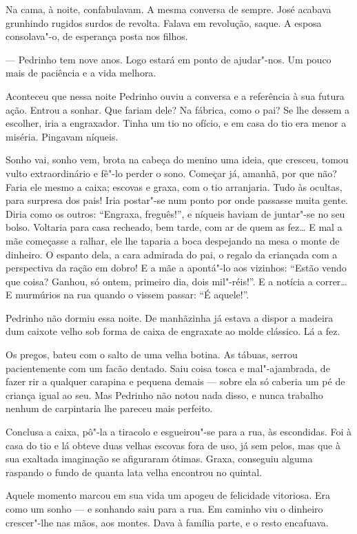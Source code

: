 Na cama, à noite, confabulavam. A mesma conversa de sempre. José acabava
grunhindo rugidos surdos de revolta. Falava em revolução, saque. A
esposa consolava"-o, de esperança posta nos filhos.

--- Pedrinho tem nove anos. Logo estará em ponto de ajudar"-nos. Um pouco
mais de paciência e a vida melhora.

Aconteceu que nessa noite Pedrinho ouviu a conversa e a referência à sua
futura ação. Entrou a sonhar. Que fariam dele? Na fábrica, como o pai?
Se lhe dessem a escolher, iria a engraxador. Tinha um tio no ofício, e
em casa do tio era menor a miséria. Pingavam níqueis.

Sonho vai, sonho vem, brota na cabeça do menino uma ideia, que cresceu,
tomou vulto extraordinário e fê"-lo perder o sono. Começar já, amanhã,
por que não? Faria ele mesmo a caixa; escovas e graxa, com o tio
arranjaria. Tudo às ocultas, para surpresa dos pais! Iria postar"-se num
ponto por onde passasse muita gente. Diria como os outros: ``Engraxa,
freguês!'', e níqueis haviam de juntar"-se no seu bolso. Voltaria para
casa recheado, bem tarde, com ar de quem as fez\ldots{} E mal a mãe começasse
a ralhar, ele lhe taparia a boca despejando na mesa o monte de dinheiro.
O espanto dela, a cara admirada do pai, o regalo da criançada com a
perspectiva da ração em dobro! E a mãe a apontá"-lo aos vizinhos: ``Estão
vendo que coisa? Ganhou, só ontem, primeiro dia, dois mil"-réis!''. E a
notícia a correr\ldots{} E murmúrios na rua quando o vissem passar: ``É
aquele!''.

Pedrinho não dormiu essa noite. De manhãzinha já estava a dispor a
madeira dum caixote velho sob forma de caixa de engraxate ao molde
clássico. Lá a fez.

Os pregos, bateu com o salto de uma velha botina. As tábuas, serrou
pacientemente com um facão dentado. Saiu coisa tosca e mal"-ajambrada, de
fazer rir a qualquer carapina e pequena demais --- sobre ela só caberia
um pé de criança igual ao seu. Mas Pedrinho não notou nada disso, e
nunca trabalho nenhum de carpintaria lhe pareceu mais perfeito.

Conclusa a caixa, pô"-la a tiracolo e esgueirou"-se para a rua, às
escondidas. Foi à casa do tio e lá obteve duas velhas escovas fora de
uso, já sem pelos, mas que à sua exaltada imaginação se afiguraram
ótimas. Graxa, conseguiu alguma raspando o fundo de quanta lata velha
encontrou no quintal.

Aquele momento marcou em sua vida um apogeu de felicidade vitoriosa. Era
como um sonho --- e sonhando saiu para a rua. Em caminho viu o dinheiro
crescer"-lhe nas mãos, aos montes. Dava à família parte, e o resto
encafuava.

